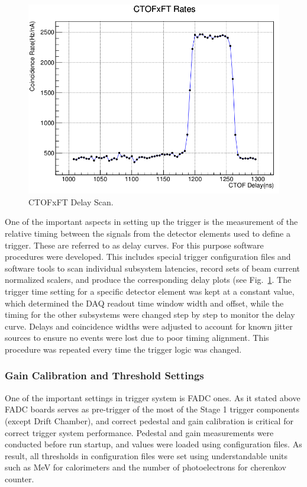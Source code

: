 \begin{figure}[hbt]
	\centering
	\includegraphics[width=1.0\columnwidth,keepaspectratio]{img/delay_scan_ctof_ft.png}
	\caption{CTOFxFT Delay Scan.}
	\label{fig:delay_scan_ctof_ft}
\end{figure}

One of the important aspects in setting up the trigger is the measurement of the relative timing between the signals from the detector elements used to define a trigger. These are referred to as delay curves. For this purpose software procedures were developed. This includes special trigger configuration files and software tools to scan individual subsystem latencies, record sets of beam current normalized scalers, and produce the corresponding delay plots (see Fig.~\ref{fig:delay_scan_ctof_ft}. The trigger time setting for a specific detector element was kept at a constant value, which determined the DAQ readout time window width and offset, while the timing for the other subsystems were changed step by step to monitor the delay curve. Delays and coincidence widths were adjusted to account for known jitter sources to ensure no events were lost due to poor timing alignment. This procedure was repeated every time the trigger logic was changed.


\subsubsection{Gain Calibration and Threshold Settings}

One of the important settings in trigger system is FADC ones. As it stated above FADC boards serves as pre-trigger of the most of the Stage 1 trigger components (except Drift Chamber), and correct pedestal and gain calibration is critical for correct trigger system performance. Pedestal and gain measurements were conducted before run startup, and values were loaded using configuration files. As result, all thresholds in configuration files were set using understandable units such as MeV for calorimeters and the number of photoelectrons for cherenkov counter.



